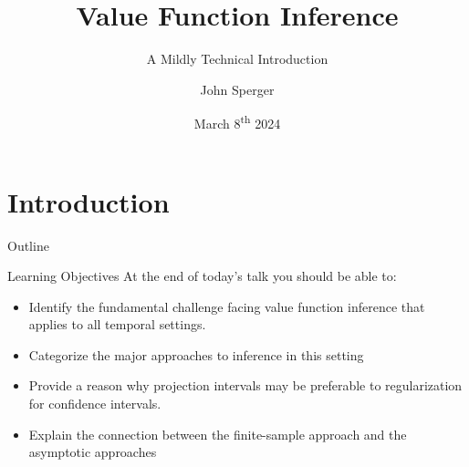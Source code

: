 \documentclass[aspectratio=169, professionalfonts, handout]{beamer}
\author{John Sperger}
\date{March 8\textsuperscript{th} 2024}
\title{Value Function Inference}
\subtitle{A Mildly Technical Introduction}
\begin{document}
\maketitle

\section{Introduction}
\begin{frame}{Outline}
	\tableofcontents[hideallsubsections]
\end{frame}
\begin{frame}[label={overview:objectives}]{Learning Objectives}
	\vfill \pause
	At the end of today's talk you should be able to:
	\begin{itemize}
		\item Identify the fundamental challenge facing value function
		      inference		      that applies to all temporal settings.
		      \vfill \pause


		\item Categorize the major approaches to inference in this setting

		      \vfill \pause

		\item Provide a reason why projection intervals may be preferable to
		      regularization for confidence intervals.
		      \vfill \pause

		\item Explain the connection between the finite-sample approach and the
		      asymptotic approaches
	\end{itemize}
	\vfill
\end{frame}

\end{document}
